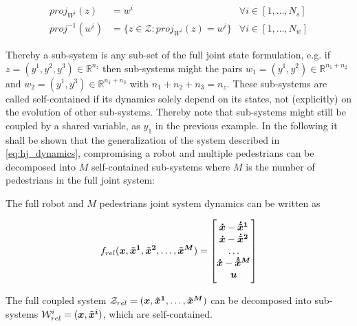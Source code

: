 \begin{align}
proj_{W^i}(z) &= w^i & \forall i \in [1, \hdots, N_s] \\
proj^{-1}(w^i) &= \{z \in \mathcal{Z}: proj_{W^i}(z) = w^i \} & \forall i \in [1, \hdots, N_w]
\label{eq:hj_projection}
\end{align}

Thereby a sub-system is any sub-set of the full joint state formulation, e.g. if $z = (y^1, y^2, y^3) \in \mathbb{R}^{n_z}$ then sub-systems might the pairs $w_1 = (y^1, y^2) \in \mathbb{R}^{n_1 + n_2}$ and $w_2 = (y^1, y^3) \in \mathbb{R}^{n_1 + n_3}$ with $n_1 + n_2 + n_3 = n_z$. These sub-systems are called self-contained if its dynamics solely depend on its states, not (explicitly) on the evolution of other sub-systems. Thereby note that sub-systems might still be coupled by a shared variable, as $y_1$ in the previous example.
\newline
In the following it shall be shown that the generalization of the system described in \ref{eq:hj_dynamics}, compromising a robot and multiple pedestrians can be decomposed into $M$ self-contained sub-systems where $M$ is the number of pedestrians in the full joint system: \\

\begin{corollary}
The full robot and $M$ pedestrians joint system dynamics can be written as 

\begin{equation}
\frel(\x, \xped[1], \xped[2], \hdots, \xped[M]) = 
\begin{bmatrix} 
\dx - \dxped[1] \\ 
\dx - \dxped[2] \\ 
\hdots \\
\dx - \dxped[M] \\ 
\u
\end{bmatrix}
\label{eq:hj_dynamics_full}
\end{equation}

The full coupled system $\mathcal{Z}_{rel} = (\x, \xped[1], \hdots, \xped[M])$ can be decomposed into sub-systems $\mathcal{W}_{rel}^i = (\x, \xped[i])$, which are self-contained. 
\label{co:hj_sub_systems}
\end{corollary}

